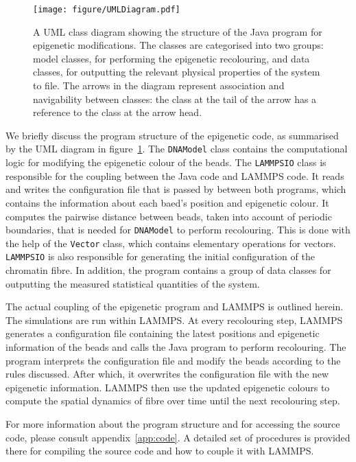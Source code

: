 \documentclass[12pt]{article}
\begin{document}
\begin{figure}[t]
\centering
\texttt{[image: figure/UMLDiagram.pdf]}
\caption{A UML class diagram showing the structure of the Java program for epigenetic modifications. The classes are categorised into two groups: model classes, for performing the epigenetic recolouring, and data classes, for outputting the relevant physical properties of the system to file. The arrows in the diagram represent association and navigability between classes: the class at the tail of the arrow has a reference to the class at the arrow head.}
\label{fig:uml}
\end{figure}

We briefly discuss the program structure of the epigenetic code, as summarised by the UML diagram in figure~\ref{fig:uml}. The \texttt{DNAModel} class contains the computational logic for modifying the epigenetic colour of the beads. The \texttt{LAMMPSIO} class is responsible for the coupling between the Java code and LAMMPS code. It reads and writes the configuration file that is passed by between both programs, which contains the information about each baed's position and epigenetic colour. It computes the pairwise distance between beads, taken into account of periodic boundaries, that is needed for \texttt{DNAModel} to perform recolouring. This is done with the help of the \texttt{Vector} class, which contains elementary operations for vectors. \texttt{LAMMPSIO} is also responsible for generating the initial configuration of the chromatin fibre. In addition, the program contains a group of data classes for outputting the measured statistical quantities of the system. 

The actual coupling of the epigenetic program and LAMMPS is outlined herein. The simulations are run within LAMMPS. At every recolouring step, LAMMPS generates a configuration file containing the latest positions and epigenetic information of the beads and calls the Java program to perform recolouring. The program interprets the configuration file and modify the beads according to the rules discussed. After which, it overwrites the configuration file with the new epigenetic information. LAMMPS then use the updated epigenetic colours to compute the spatial dynamics of fibre over time until the next recolouring step.

For more information about the program structure and for accessing the source code, please consult appendix~\ref{app:code}. A detailed set of procedures is provided there for compiling the source code and how to couple it with LAMMPS.
\end{document}
